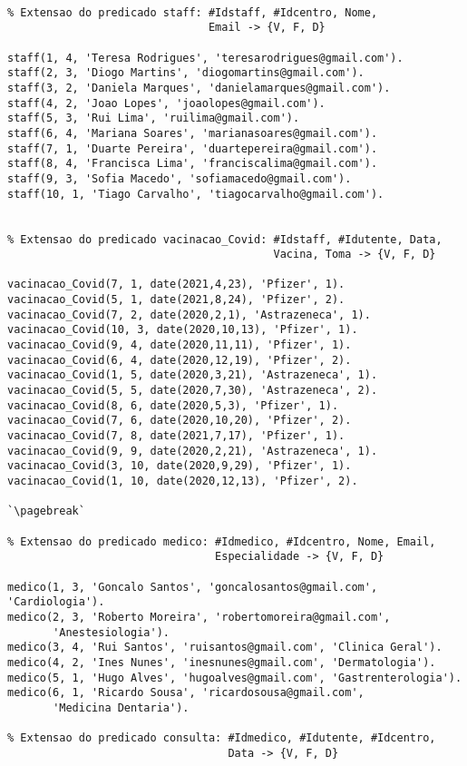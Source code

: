\begin{lstlisting}[caption={Povoamento inicial da Base de Conhecimento com Conhecimento Perfeito Positivo}]
             
% Extensao do predicado staff: #Idstaff, #Idcentro, Nome, 
                               Email -> {V, F, D}
                               
staff(1, 4, 'Teresa Rodrigues', 'teresarodrigues@gmail.com').
staff(2, 3, 'Diogo Martins', 'diogomartins@gmail.com').
staff(3, 2, 'Daniela Marques', 'danielamarques@gmail.com').
staff(4, 2, 'Joao Lopes', 'joaolopes@gmail.com').
staff(5, 3, 'Rui Lima', 'ruilima@gmail.com').
staff(6, 4, 'Mariana Soares', 'marianasoares@gmail.com').
staff(7, 1, 'Duarte Pereira', 'duartepereira@gmail.com').
staff(8, 4, 'Francisca Lima', 'franciscalima@gmail.com').
staff(9, 3, 'Sofia Macedo', 'sofiamacedo@gmail.com').
staff(10, 1, 'Tiago Carvalho', 'tiagocarvalho@gmail.com').


% Extensao do predicado vacinacao_Covid: #Idstaff, #Idutente, Data,
                                         Vacina, Toma -> {V, F, D}
                                         
vacinacao_Covid(7, 1, date(2021,4,23), 'Pfizer', 1).
vacinacao_Covid(5, 1, date(2021,8,24), 'Pfizer', 2).
vacinacao_Covid(7, 2, date(2020,2,1), 'Astrazeneca', 1).
vacinacao_Covid(10, 3, date(2020,10,13), 'Pfizer', 1).
vacinacao_Covid(9, 4, date(2020,11,11), 'Pfizer', 1).
vacinacao_Covid(6, 4, date(2020,12,19), 'Pfizer', 2).
vacinacao_Covid(1, 5, date(2020,3,21), 'Astrazeneca', 1).
vacinacao_Covid(5, 5, date(2020,7,30), 'Astrazeneca', 2).
vacinacao_Covid(8, 6, date(2020,5,3), 'Pfizer', 1).
vacinacao_Covid(7, 6, date(2020,10,20), 'Pfizer', 2).
vacinacao_Covid(7, 8, date(2021,7,17), 'Pfizer', 1).
vacinacao_Covid(9, 9, date(2020,2,21), 'Astrazeneca', 1).
vacinacao_Covid(3, 10, date(2020,9,29), 'Pfizer', 1).
vacinacao_Covid(1, 10, date(2020,12,13), 'Pfizer', 2).

`\pagebreak`

% Extensao do predicado medico: #Idmedico, #Idcentro, Nome, Email,
                                Especialidade -> {V, F, D}
                                
medico(1, 3, 'Goncalo Santos', 'goncalosantos@gmail.com', 'Cardiologia').
medico(2, 3, 'Roberto Moreira', 'robertomoreira@gmail.com',
       'Anestesiologia').
medico(3, 4, 'Rui Santos', 'ruisantos@gmail.com', 'Clinica Geral').
medico(4, 2, 'Ines Nunes', 'inesnunes@gmail.com', 'Dermatologia').
medico(5, 1, 'Hugo Alves', 'hugoalves@gmail.com', 'Gastrenterologia').
medico(6, 1, 'Ricardo Sousa', 'ricardosousa@gmail.com',
       'Medicina Dentaria').
       
% Extensao do predicado consulta: #Idmedico, #Idutente, #Idcentro, 
                                  Data -> {V, F, D}
                                  

\end{lstlisting}
